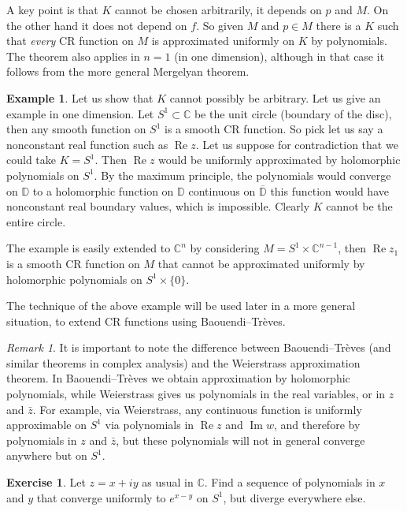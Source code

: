 \documentclass[12pt,openany]{book}
\renewcommand{\Re}{\operatorname{Re}}
\renewcommand{\Im}{\operatorname{Im}}
\newcommand{\C}{{\mathbb{C}}}
\newcommand{\D}{{\mathbb{D}}}
\theoremstyle{plain}
\theoremstyle{remark}
\newtheorem{remark}[thm]{Remark}
\theoremstyle{definition}
\newenvironment{exbox}{%
    \def\FrameCommand{\vrule width 1pt \relax\hspace {10pt}}%
    \MakeFramed {\advance \hsize -\width \FrameRestore }%
}{%
    \endMakeFramed
}
\theoremstyle{exercise}
\newtheorem{exercise}{Exercise}[section]
\theoremstyle{example}
\newtheorem{example}[thm]{Example}
\begin{document}
A key point is that $K$ cannot be chosen arbitrarily, it depends on $p$ and $M$.
On the other hand it does not depend on $f$.  So given $M$ and $p \in M$
there is a $K$ such that \emph{every} CR function on $M$ is approximated
uniformly on $K$ by polynomials.  The theorem also applies in $n=1$ (in one
dimension), although in that case it follows from the more general Mergelyan
theorem.

\begin{example}
Let us show that $K$ cannot possibly be arbitrary.  Let us give an example
in one dimension.  Let $S^1 \subset \C$ be the unit circle (boundary of the disc),
then any smooth function on $S^1$ is a smooth CR function.  So pick let us
say a nonconstant real function such as $\Re z$.  Let us suppose for
contradiction that we could take $K = S^1$.  Then $\Re z$ would be uniformly
approximated by holomorphic polynomials on $S^1$.  By the maximum principle, the
polynomials would converge on $\D$ to a holomorphic function on $\D$
continuous on $\overline{\D}$ this function would have nonconstant real boundary values,
which is impossible.  Clearly $K$ cannot be the entire circle.

The example is easily extended to $\C^n$
by considering 
$M = S^1 \times \C^{n-1}$, then $\Re z_1$ is a smooth CR function on $M$ that cannot be
approximated uniformly by holomorphic polynomials on $S^1 \times \{ 0 \}$.
\end{example}

The technique of the above example will be used later in a more general
situation, to extend CR functions using Baouendi--Tr{\`e}ves.

\begin{remark}
It is important to note the difference
between Baouendi--Tr{\`e}ves (and similar theorems
in complex analysis)
and the Weierstrass approximation theorem.  In Baouendi--Tr{\`e}ves we obtain
approximation by holomorphic polynomials, while Weierstrass gives us
polynomials in the real variables, or in $z$ and $\bar{z}$.  For example,
via Weierstrass, any continuous function is uniformly approximable on $S^1$ via polynomials
in $\Re z$ and $\Im w$, and therefore by polynomials in $z$ and $\bar{z}$,
but these polynomials will not in general converge anywhere but on $S^1$.
\end{remark}

\begin{exbox}
\begin{exercise}
Let $z=x+iy$ as usual in $\C$.
Find a sequence of polynomials in $x$ and $y$ that converge uniformly to $e^{x-y}$ on $S^1$,
but diverge everywhere else.
\end{exercise}
\end{exbox}
\end{document}
